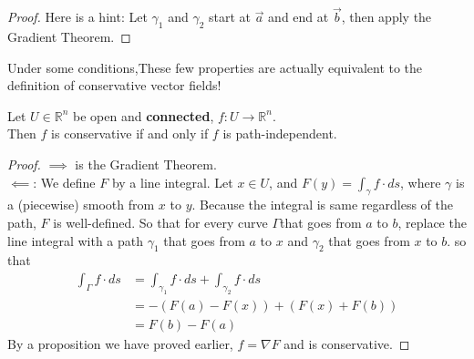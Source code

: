 \documentclass[11pt,openany]{book}
\newcommand{\theorem}[2]{\begin{tcolorbox}[title=Theorem ({#1}),colframe=red!70!black,colback=red!5!white]{#2}\end{tcolorbox}
}
\begin{document}
	\begin{proof}
		Here is a hint:
		Let $\gamma_1$ and $\gamma_2$ start at $\vec{a}$ and end at $\vec{b}$, then apply the Gradient Theorem.
	\end{proof}
	Under some conditions,These few properties are actually equivalent to the definition of conservative vector fields!
	\theorem{Gradient (converse)}{
		Let $U\in\mathbb{R}^n$ be open and \textbf{connected}, $f:U\to\mathbb{R}^n$. \\
		Then $f$ is conservative if and only if $f$ is path-independent.
	}
	\begin{proof}
		$\implies$ is the Gradient Theorem.\\
		$\impliedby$:
		We define $F$ by a line integral.
		Let $x \in U$, and $F(y) = \int_\gamma f \cdot ds$, where $\gamma$ is a (piecewise) smooth from $x$ to $y$.
		Because the integral is same regardless of the path, $F$ is well-defined.
		So that for every curve $\Gamma$that goes from $a$ to $b$, replace the line integral with a path $\gamma_1$ that goes from $a$ to $x$
		and $\gamma_2$ that goes from $x$ to $b$.
		so that \begin{align*}
			\int_\Gamma f\cdot ds &= \int_{\gamma_1} f\cdot ds + \int_{\gamma_2} f\cdot ds \\
			&= - (F(a) - F(x) ) + (F(x) + F(b))\\
			&= F(b) - F(a)
		\end{align*}
		By a proposition we have proved earlier, $f=\nabla F$ and is conservative. 
	\end{proof}
	
\end{document}
